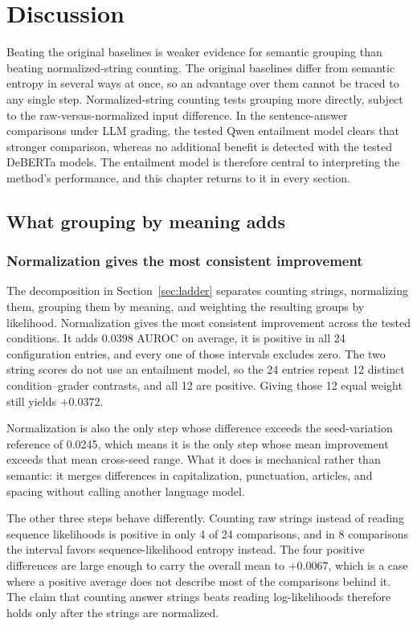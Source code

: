 \chapter{Discussion}
\label{ch:discussion}

Beating the original baselines is weaker evidence for semantic grouping than
beating normalized-string counting. The original baselines differ from semantic
entropy in several ways at once, so an advantage over them cannot be traced to
any single step. Normalized-string counting tests grouping more directly,
subject to the raw-versus-normalized input difference. In the
sentence-answer comparisons under LLM grading, the tested Qwen entailment model
clears that stronger comparison, whereas no additional benefit is detected with
the tested DeBERTa models. The entailment model is therefore central to
interpreting the method's performance, and this chapter returns to it in every
section.

\section{What grouping by meaning adds}
\label{sec:what-clustering-is-worth}

\subsection{Normalization gives the most consistent improvement}

The decomposition in Section~\ref{sec:ladder} separates counting strings,
normalizing them, grouping them by meaning, and weighting the resulting groups
by likelihood. Normalization gives the most consistent improvement across the
tested conditions. It adds 0.0398 AUROC on average, it is positive in all 24
configuration entries, and every one of those intervals excludes zero. The two
string scores do not use an entailment model, so the 24 entries repeat 12
distinct condition--grader contrasts, and all 12 are positive. Giving those 12
equal weight still yields $+0.0372$.

Normalization is also the only step whose
difference exceeds the seed-variation reference of 0.0245, which means it is
the only step whose mean improvement exceeds that mean cross-seed range.
What it does is mechanical rather than
semantic: it merges differences in capitalization, punctuation, articles, and
spacing without calling another language model.

The other three steps behave differently. Counting raw strings instead of
reading sequence likelihoods is positive in only 4 of 24 comparisons, and in 8
comparisons the interval favors sequence-likelihood entropy instead. The four
positive differences are large enough to carry the overall mean to $+0.0067$,
which is a case where a positive average does not describe most of the
comparisons behind it. The claim that counting answer strings beats reading
log-likelihoods therefore holds only after the strings are normalized.

